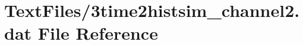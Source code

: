 \hypertarget{3time2histsim__channel2_8dat}{}\section{Text\+Files/3time2histsim\+\_\+channel2.dat File Reference}
\label{3time2histsim__channel2_8dat}
